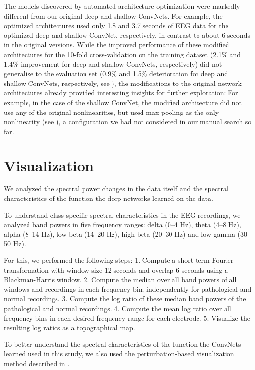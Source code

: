     The models discovered by automated architecture optimization were
markedly different from our original deep and shallow ConvNets. For
example, the optimized architectures used only 1.8 and 3.7 seconds of
EEG data for the optimized deep and shallow ConvNet, respectively, in
contrast to about 6 seconds in the original versions. While the improved
performance of these modified architectures for the 10-fold
cross-validation on the training dataset (2.1\% and 1.4\% improvement
for deep and shallow ConvNets, respectively) did not generalize to the
evaluation set (0.9\% and 1.5\% deterioration for deep and shallow
ConvNets, respectively, see ),
the modifications to the original network architectures already provided
interesting insights for further exploration: For example, in the case
of the shallow ConvNet, the modified architecture did not use any of the
original nonlinearities, but used max pooling as the only nonlinearity
(see ), a configuration we
had not considered in our manual search so far.

    \hypertarget{visualization}{%
\section{Visualization}\label{visualization}}

    We analyzed the spectral power changes in the data itself and the
spectral characteristics of the function the deep networks learned on
the data.

    To understand class-specific spectral characteristics in the EEG
recordings, we analyzed band powers in five frequency ranges: delta
(0--4 Hz), theta (4--8 Hz), alpha (8--14 Hz), low beta (14--20 Hz), high
beta (20--30 Hz) and low gamma (30--50 Hz).

For this, we performed the following steps: 1. Compute a short-term
Fourier transformation with window size 12 seconds and overlap 6 seconds
using a Blackman-Harris window. 2. Compute the median over all band
powers of all windows and recordings in each frequency bin;
independently for pathological and normal recordings. 3. Compute the log
ratio of these median band powers of the pathological and normal
recordings. 4. Compute the mean log ratio over all frequency bins in
each desired frequency range for each electrode. 5. Visualize the
resulting log ratios as a topographical map.

To better understand the spectral characteristics of the function the
ConvNets learned used in this study, we also used the perturbation-based
visualization method described in
\citet{schirrmeisterdeephbm2017}.

